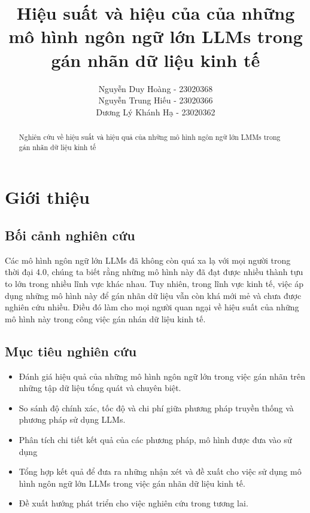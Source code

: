 \documentclass{article} %
\title{Hiệu suất và hiệu của của những mô hình ngôn ngữ lớn LLMs trong gán nhãn dữ liệu kinh tế}
\author{
    Nguyễn Duy Hoàng - 23020368\\
    Nguyễn Trung Hiếu - 23020366\\
    Dương Lý Khánh Hạ - 23020362
}
\begin{document}
\maketitle
\tableofcontents


\begin{abstract}
    Nghiên cứu về hiệu suất và hiệu quả của những mô hình ngôn ngữ lớn LMMs trong gán nhãn dữ liệu kinh tế
\end{abstract}



\section{\textbf{Giới thiệu}}
\subsection{Bối cảnh nghiên cứu}

Các mô hình ngôn ngữ lớn LLMs đã không còn quá xa lạ với mọi người trong thời đại 4.0, 
chúng ta biết rằng những mô hình này đã đạt được nhiều thành tựu to lớn trong nhiều lĩnh vực khác nhau.
Tuy nhiên, trong lĩnh vực kinh tế, việc áp dụng những mô hình này để gán nhãn dữ liệu vẫn còn khá mới mẻ
và chưa được nghiên cứu nhiều. Điều đó làm cho mọi người quan ngại về hiệu suất của những mô hình này trong 
công việc gán nhán dữ liệu kinh tế.

\subsection{Mục tiêu nghiên cứu}

\begin{itemize}

\item Đánh giá hiệu quả của những mô hình ngôn ngữ lớn trong việc gán nhãn trên những tập dữ liệu 
tổng quát và chuyên biệt.
\item So sánh độ chính xác, tốc độ và chi phí giữa phương pháp truyền thống và phương pháp sử dụng LLMs.
\item Phân tích chi tiết kết quả của các phương pháp, mô hình được đưa vào sử dụng
\item Tổng hợp kết quả để đưa ra những nhận xét và đề xuất cho việc sử dụng mô hình ngôn ngữ lớn LLMs trong việc gán nhãn dữ liệu kinh tế.
\item Đề xuất hướng phát triển cho việc nghiên cứu trong tương lai.

\end{itemize}
\end{document}
